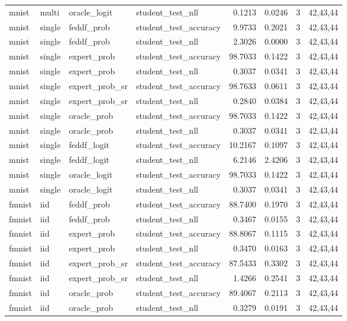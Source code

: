 \begin{tabular}{llllrrrl}
mnist & multi & oracle\_logit & student\_test\_nll & 0.1213 & 0.0246 & 3 & 42,43,44 \\
mnist & single & feddf\_prob & student\_test\_accuracy & 9.9733 & 0.2021 & 3 & 42,43,44 \\
mnist & single & feddf\_prob & student\_test\_nll & 2.3026 & 0.0000 & 3 & 42,43,44 \\
mnist & single & expert\_prob & student\_test\_accuracy & 98.7033 & 0.1422 & 3 & 42,43,44 \\
mnist & single & expert\_prob & student\_test\_nll & 0.3037 & 0.0341 & 3 & 42,43,44 \\
mnist & single & expert\_prob\_sr & student\_test\_accuracy & 98.7633 & 0.0611 & 3 & 42,43,44 \\
mnist & single & expert\_prob\_sr & student\_test\_nll & 0.2840 & 0.0384 & 3 & 42,43,44 \\
mnist & single & oracle\_prob & student\_test\_accuracy & 98.7033 & 0.1422 & 3 & 42,43,44 \\
mnist & single & oracle\_prob & student\_test\_nll & 0.3037 & 0.0341 & 3 & 42,43,44 \\
mnist & single & feddf\_logit & student\_test\_accuracy & 10.2167 & 0.1097 & 3 & 42,43,44 \\
mnist & single & feddf\_logit & student\_test\_nll & 6.2146 & 2.4206 & 3 & 42,43,44 \\
mnist & single & oracle\_logit & student\_test\_accuracy & 98.7033 & 0.1422 & 3 & 42,43,44 \\
mnist & single & oracle\_logit & student\_test\_nll & 0.3037 & 0.0341 & 3 & 42,43,44 \\
fmnist & iid & feddf\_prob & student\_test\_accuracy & 88.7400 & 0.1970 & 3 & 42,43,44 \\
fmnist & iid & feddf\_prob & student\_test\_nll & 0.3467 & 0.0155 & 3 & 42,43,44 \\
fmnist & iid & expert\_prob & student\_test\_accuracy & 88.8067 & 0.1115 & 3 & 42,43,44 \\
fmnist & iid & expert\_prob & student\_test\_nll & 0.3470 & 0.0163 & 3 & 42,43,44 \\
fmnist & iid & expert\_prob\_sr & student\_test\_accuracy & 87.5433 & 0.3302 & 3 & 42,43,44 \\
fmnist & iid & expert\_prob\_sr & student\_test\_nll & 1.4266 & 0.2541 & 3 & 42,43,44 \\
fmnist & iid & oracle\_prob & student\_test\_accuracy & 89.4067 & 0.2113 & 3 & 42,43,44 \\
fmnist & iid & oracle\_prob & student\_test\_nll & 0.3279 & 0.0191 & 3 & 42,43,44 \\

\end{tabular}
